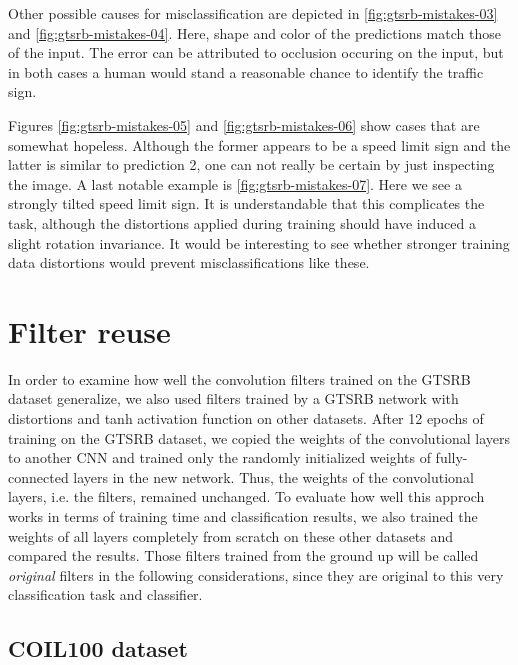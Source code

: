 \documentclass[11pt, a4paper]{article}
\begin{document}
Other possible causes for misclassification are depicted in \ref{fig:gtsrb-mistakes-03} and \ref{fig:gtsrb-mistakes-04}. Here, shape and color of the predictions match those of the input. The error can be attributed to occlusion occuring on the input, but in both cases a human would stand a reasonable chance to identify the traffic sign.

Figures \ref{fig:gtsrb-mistakes-05} and \ref{fig:gtsrb-mistakes-06} show cases that are somewhat hopeless. Although the former appears to be a speed limit sign and the latter is similar to prediction 2, one can not really be certain by just inspecting the image. A last notable example is \ref{fig:gtsrb-mistakes-07}. Here we see a strongly tilted speed limit sign. It is understandable that this complicates the task, although the distortions applied during training should have induced a slight rotation invariance. It would be interesting to see whether stronger training data distortions would prevent misclassifications like these.

\section{Filter reuse}

In order to examine how well the convolution filters trained on the GTSRB dataset generalize, we also used filters trained by a GTSRB network with distortions and tanh activation function on other datasets. After 12 epochs of training on the GTSRB dataset, we copied the weights of the convolutional layers to another CNN and trained only the randomly initialized weights of fully-connected layers in the new network. Thus, the weights of the convolutional layers, i.e. the filters, remained unchanged. To evaluate how well this approch works in terms of training time and classification results, we also trained the weights of all layers completely from scratch on these other datasets and compared the results. Those filters trained from the ground up will be called \textit{original} filters in the following considerations, since they are original to this very classification task and classifier.

\subsection{COIL100 dataset}
\end{document}
